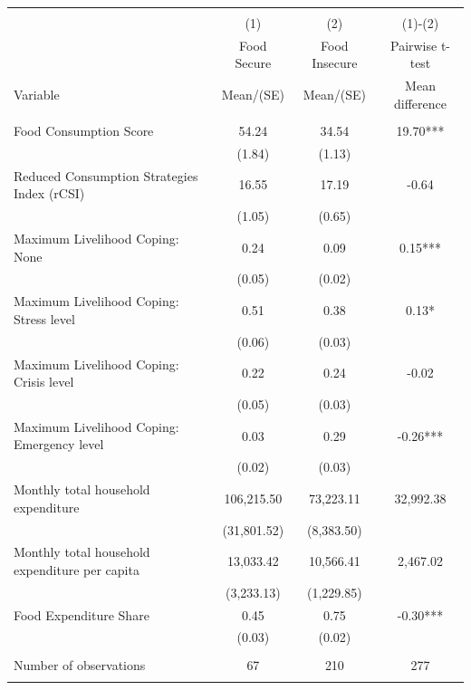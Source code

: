 
\begin{tabular}{@{\extracolsep{5pt}}lccc}
\\[-1.8ex]\hline \hline \\[-1.8ex]
 & \multicolumn{1}{c}{(1)}  & \multicolumn{1}{c}{(2)}  & \multicolumn{1}{c}{(1)-(2)} \\
 & \multicolumn{1}{c}{Food Secure}  & \multicolumn{1}{c}{Food Insecure}  & \multicolumn{1}{c}{Pairwise t-test}  \\
Variable & Mean/(SE) & Mean/(SE) & Mean difference \\ \hline \\[-1.8ex] 
Food Consumption Score   & 54.24    & 34.54    & 19.70***   \\
 & (1.84)  & (1.13)  &  \\ [1ex]
Reduced Consumption Strategies Index (rCSI)   & 16.55    & 17.19    & -0.64   \\
 & (1.05)  & (0.65)  &  \\ [1ex]
Maximum Livelihood Coping: None   & 0.24    & 0.09    & 0.15***   \\
 & (0.05)  & (0.02)  &  \\ [1ex]
Maximum Livelihood Coping: Stress level   & 0.51    & 0.38    & 0.13*   \\
 & (0.06)  & (0.03)  &  \\ [1ex]
Maximum Livelihood Coping: Crisis level   & 0.22    & 0.24    & -0.02   \\
 & (0.05)  & (0.03)  &  \\ [1ex]
Maximum Livelihood Coping: Emergency level   & 0.03    & 0.29    & -0.26***   \\
 & (0.02)  & (0.03)  &  \\ [1ex]
Monthly total household expenditure   & 106,215.50    & 73,223.11    & 32,992.38   \\
 & (31,801.52)  & (8,383.50)  &  \\ [1ex]
Monthly total household expenditure per capita   & 13,033.42    & 10,566.41    & 2,467.02   \\
 & (3,233.13)  & (1,229.85)  &  \\ [1ex]
Food Expenditure Share   & 0.45    & 0.75    & -0.30***   \\
 & (0.03)  & (0.02)  &  \\ [1ex]
\hline \\[-1.8ex]
Number of observations  & 67   & 210  & 277  \\
\hline \hline \\[-1.8ex]

\end{tabular}
